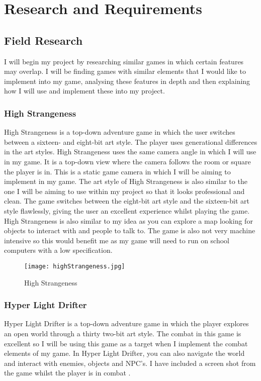 \documentclass[12pt]{report}
\begin{document}
\pagebreak

\chapter{Research and Requirements}
\section{Field Research}
I will begin my project by researching similar games in which certain features may overlap. I will be finding games with similar elements that I would like to implement into my game, analysing these features in depth and then explaining how I will use and implement these into my project. 

\subsection{High Strangeness}
High Strangeness is a top-down adventure game in which the user switches between a sixteen- and eight-bit art style. The player uses generational differences in the art styles. High Strangeness uses the same camera angle in which I will use in my game. It is a top-down view where the camera follows the room or square the player is in. This is a static game camera in which I will be aiming to implement in my game. The art style of High Strangeness is also similar to the one I will be aiming to use within my project so that it looks professional and clean. The game switches between the eight-bit art style and the sixteen-bit art style flawlessly, giving the user an excellent experience whilst playing the game. High Strangeness is also similar to my idea as you can explore a map looking for objects to interact with and people to talk to. The game is also not very machine intensive so this would benefit me as my game will need to run on school computers with a low specification. \cite{high strangeness}  

\begin{figure}[h]
    \centering
    \texttt{[image: highStrangeness.jpg]}
    \caption{High Strangeness \cite{high strangeness}}
    \label{HighStangeness}
\end{figure}

\pagebreak

\subsection{Hyper Light Drifter}
Hyper Light Drifter is a top-down adventure game in which the player explores an open world through a thirty two-bit art style. The combat in this game is excellent so I will be using this game as a target when I implement the combat elements of my game. In Hyper Light Drifter, you can also navigate the world and interact with enemies, objects and NPC’s. I have included a screen shot from the game whilst the player is in combat \cite{hyperL}. 
\end{document}
